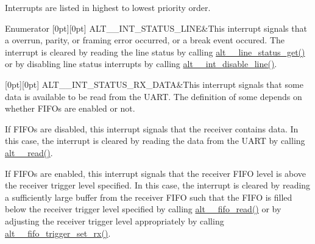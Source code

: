 Interrupts are listed in highest to lowest priority order. \begin{DoxyEnumFields}{Enumerator}
[0pt][0pt]{}\mbox{\label{group__UART__INT_gga108129e1efabc17da3950f0b654c62d0a406992fcb750a0dea86f887048f82ca2}} 
A\+L\+T\+\_\+\_\+\+I\+N\+T\+\_\+\+S\+T\+A\+T\+U\+S\+\_\+\+L\+I\+NE&This interrupt signals that a overrun, parity, or framing error occurred, or a break event occured. The interrupt is cleared by reading the line status by calling \mbox{\hyperlink{group__UART__LINE_gae108dc72c29861f56514d4204d52c0ed}{alt\+\_\+\_\+line\+\_\+status\+\_\+get()}} or by disabling line status interrupts by calling \mbox{\hyperlink{group__UART__INT_ga652e3e68bb153de588b222bb2b783770}{alt\+\_\+\_\+int\+\_\+disable\+\_\+line()}}. \\
\hline

[0pt][0pt]{}\mbox{\label{group__UART__INT_gga108129e1efabc17da3950f0b654c62d0a4056b5ca53f994d56d537ff8af94e691}} 
A\+L\+T\+\_\+\_\+\+I\+N\+T\+\_\+\+S\+T\+A\+T\+U\+S\+\_\+\+R\+X\+\_\+\+D\+A\+TA&This interrupt signals that some data is available to be read from the U\+A\+RT. The definition of some depends on whether F\+I\+F\+Os are enabled or not.

If F\+I\+F\+Os are disabled, this interrupt signals that the receiver contains data. In this case, the interrupt is cleared by reading the data from the U\+A\+RT by calling \mbox{\hyperlink{group__UART__BASIC_ga0124c84775e913daec8eec21ffcef4df}{alt\+\_\+\_\+read()}}.

If F\+I\+F\+Os are enabled, this interrupt signals that the receiver F\+I\+FO level is above the receiver trigger level specified. In this case, the interrupt is cleared by reading a sufficiently large buffer from the receiver F\+I\+FO such that the F\+I\+FO is filled below the receiver trigger level specified by calling \mbox{\hyperlink{group__UART__FIFO_ga0ce2f31d207024b0f240b2020ab6fd94}{alt\+\_\+\_\+fifo\+\_\+read()}} or by adjusting the receiver trigger level appropriately by calling \mbox{\hyperlink{group__UART__FIFO_ga2edadfb8154ec759d6f64332cb358799}{alt\+\_\+\_\+fifo\+\_\+trigger\+\_\+set\+\_\+rx()}}.


\end{DoxyEnumFields}
